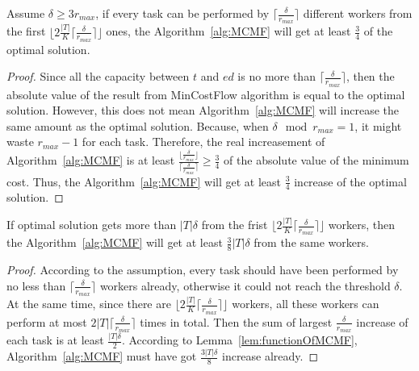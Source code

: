 \begin{lemma}
\label{lem:functionOfMCMF}
Assume $\delta \ge 3r_{max}$,
if every task can be performed by $\lceil \frac{\delta}{r_{max}} \rceil$ different workers from the first $\lfloor 2\frac{|T|}{K}\lceil \frac{\delta}{r_{max}} \rceil \rfloor$ ones,
the Algorithm~\ref{alg:MCMF} will get at least $\frac{3}{4}$ of the optimal solution.
\end{lemma}
\begin{proof}
Since all the capacity between $t$ and $ed$ is no more than $\lceil \frac{\delta}{r_{max}} \rceil$,
then the absolute value of the result from MinCostFlow algorithm is equal to the optimal solution.
However, this does not mean Algorithm~\ref{alg:MCMF} will increase the same amount as the optimal solution.
Because, when $\delta \mod r_{max} = 1$, it might waste $r_{max}-1$ for each task.
Therefore, the real increasement of Algorithm~\ref{alg:MCMF} is at least 
$\frac{\lfloor \frac{\delta}{r_{max}} \rfloor}{\lceil \frac{\delta}{r_{max}} \rceil} \ge \frac{3}{4}$ of the absolute value of the minimum cost.
Thus, the Algorithm~\ref{alg:MCMF} will get at least $\frac{3}{4}$ increase of the optimal solution.
\end{proof}

\begin{lemma}
\label{lem:portionFinish}
If optimal solution gets more than $|T|\delta$ from the frist $\lfloor 2\frac{|T|}{K}\lceil \frac{\delta}{r_{max}} \rceil \rfloor$ workers,
then the Algorithm~\ref{alg:MCMF} will get at least $\frac{3}{8}|T|\delta$ from the same workers.
\end{lemma}
\begin{proof}
According to the assumption, every task should have been performed by no less than $\lceil \frac{\delta}{r_{max}} \rceil$ workers already,
otherwise it could not reach the threshold $\delta$.
At the same time, since there are $\lfloor 2\frac{|T|}{K}\lceil \frac{\delta}{r_{max}} \rceil \rfloor$ workers, 
all these workers can perform at most $2|T|\lceil \frac{\delta}{r_{max}} \rceil$ times in total.
Then the sum of largest $\frac{\delta}{r_{max}}$ increase of each task is at least $\frac{|T|\delta}{2}$.
According to Lemma~\ref{lem:functionOfMCMF}, Algorithm~\ref{alg:MCMF} must 
have got $\frac{3|T|\delta}{8}$ increase already.
\end{proof}

